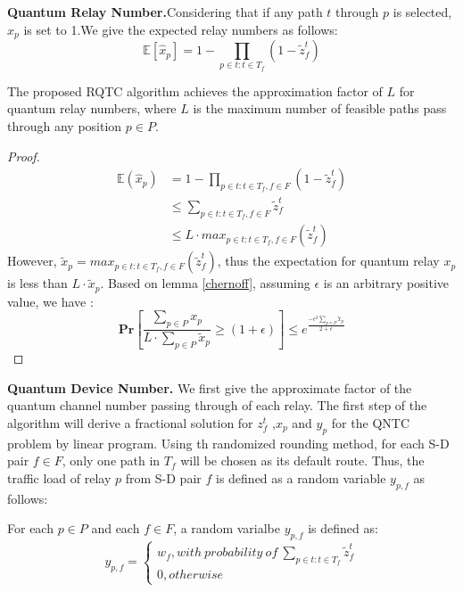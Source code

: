 \textbf{Quantum Relay Number.}Considering that if any path $t$ through $p$ is selected, $\hat{x}_p$ is set to 1.We give the expected relay numbers as follows:
\begin{equation}
\mathbb{E}[\hat{x}_p] = 1 - \prod_{p \in t: t \in T_f}{(1-\widetilde{z}_f^t)}
\end{equation}
\begin{theorem}
  The proposed RQTC algorithm achieves the approximation factor of $L$ for quantum relay numbers, where $L$ is the maximum number of feasible paths pass through any position $p \in P$.
  \begin{proof}
  \begin{equation}
  \begin{aligned}
    \mathbb{E}(\hat{x}_p) &= 1 - \prod_{p \in t: t \in T_f,f \in F}{(1-\widetilde{z}_f^t)} \\
    &\le \sum_{p \in t: t \in T_f,f \in F}\widetilde{z}_f^t \\
    &\le L \cdot max_{p \in t: t \in T_f,f \in F}(\widetilde{z}_f^t)
    \end{aligned}
  \end{equation}
  However, $\widetilde{x}_p = max_{p \in t: t \in T_f,f \in F}(\widetilde{z}_f^t)$, thus the expectation for quantum relay $x_p$ is less than $L \cdot \widetilde{x}_p$. Based on lemma \ref{chernoff},  assuming $\epsilon$ is an arbitrary positive value, we have :
  \begin{equation}\label{pr1}
    \textbf{Pr}[\frac{\sum_{p \in P}x_p}{L \cdot \sum_{p \in P}\widetilde{x}_p} \ge (1+\epsilon)] \le e^{\frac{-\epsilon^2\sum_{p \in P}\widetilde{x}_p}{2+\epsilon}}
  \end{equation}
  \end{proof}
\end{theorem}


\textbf{Quantum Device Number.} We first give the approximate factor of the quantum channel number passing through of each relay. The first step of the algorithm will derive a fractional solution for $z_f^t$ ,$x_p$ and $y_p$ for the QNTC problem by linear program. Using th  randomized rounding method, for each S-D pair $f \in F$, only one path in $T_f$ will be chosen as its default route. Thus, the traffic load of relay $p$ from S-D pair $f$ is defined as a random variable $y_{p,f}$ as follows:
\begin{definition}\label{def1}
For each $p \in P$ and each $f \in F$, a random varialbe $y_{p,f}$ is defined as:
\begin{equation}\label{ypf}
y_{p,f}=
\begin{cases}
   w_f, with \ probability \ of \ \sum_{p \in t:t \in T_f}\widetilde{z}_f^t \\
   0, otherwise
\end{cases}
\end{equation}

\end{definition}

